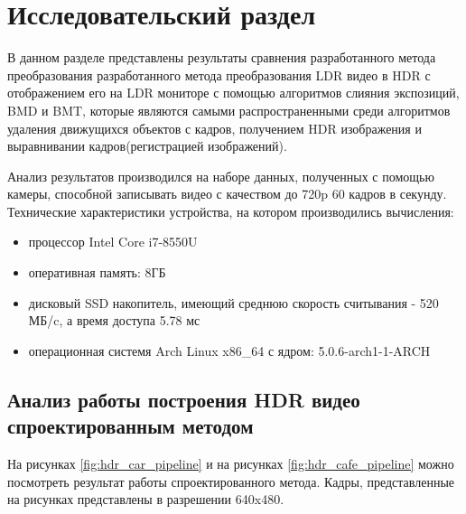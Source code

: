 \chapter{Исследовательский раздел}

В данном разделе представлены  результаты сравнения разработанного метода преобразования разработанного метода преобразования LDR видео в HDR с отображением его на LDR мониторе с помощью алгоритмов слияния экспозиций, BMD и BMT, которые являются самыми распространенными среди алгоритмов удаления движущихся объектов с кадров, получением HDR изображения и выравнивании кадров(регистрацией изображений).

Анализ результатов производился на наборе данных, полученных с помощью камеры, способной записывать видео с качеством до 720p 60 кадров в секунду. Технические характеристики устройства, на котором производились вычисления:

\begin{itemize}
    \item процессор Intel Core i7-8550U
    \item оперативная память: 8ГБ
    \item дисковый SSD накопитель, имеющий среднюю скорость считывания - 520 МБ/c, а время доступа 5.78 мс
        \item операционная системя Arch Linux x86\_64 с ядром: 5.0.6-arch1-1-ARCH
\end{itemize}

\section{ Анализ работы построения HDR видео спроектированным методом}

На рисунках \ref{fig:hdr_car_pipeline} и на рисунках \ref{fig:hdr_cafe_pipeline} можно посмотреть результат работы спроектированного метода. Кадры, представленные на рисунках представлены в разрешении 640x480.


